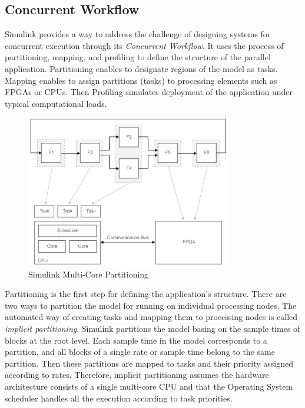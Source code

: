 \subsection{Concurrent Workflow}
Simulink provides a way to address the challenge of designing systems for concurrent execution through its \emph{Concurrent Workflow}. It uses the process of partitioning, mapping, and profiling to define the structure of the parallel application.
Partitioning enables to designate regions of the model as tasks. Mapping enables to assign partitions (tasks) to processing elements such as FPGAs or CPUs. Then Profiling simulates deployment of the application under typical computational loads.
\begin{figure}[htbp] 
\centering    
\includegraphics[width=0.8\textwidth]{SimulinkConcurrentWorkflow.png}
\caption{Simulink Multi-Core Partitioning}
\label{fig:SimulinkTaskPartitioning}
\end{figure}
\par Partitioning is the first step for defining the application's structure. There are two ways to partition the model for running on individual processing nodes.
The automated way of creating tasks and mapping them to processing nodes is called \emph{implicit partitioning}. Simulink partitions the model basing on the sample times of blocks at the root level. Each sample time in the model corresponds to a partition, and all blocks of a single rate or sample time belong to the same partition. Then these partitions are mapped to tasks and their priority assigned according to rates. Therefore, implicit partitioning assumes the hardware architecture consists of a single multi-core CPU and that the Operating System scheduler handles all the execution according to task priorities.
